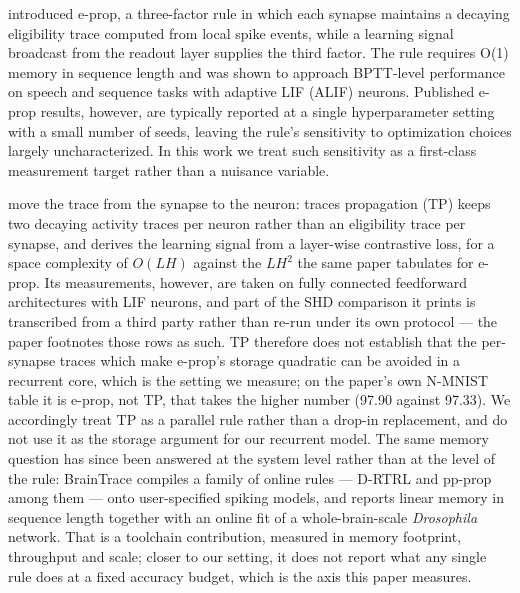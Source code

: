 \documentclass[11pt]{article}
\begin{document}
\citet{bellec2020eprop} introduced e-prop, a three-factor rule in which each
synapse maintains a decaying eligibility trace computed from local spike
events, while a learning signal broadcast from the readout layer supplies the
third factor. The rule requires O(1) memory in sequence length and was shown to
approach BPTT-level performance on speech and sequence tasks with adaptive
LIF (ALIF) neurons. Published e-prop results, however, are typically reported
at a single hyperparameter setting with a small number of seeds, leaving the
rule's sensitivity to optimization choices largely uncharacterized. In this
work we treat such sensitivity as a first-class measurement target rather
than a nuisance variable.

\citet{pes2025tp} move the trace from the synapse to the neuron: traces
propagation (TP) keeps two decaying activity traces per neuron rather than an
eligibility trace per synapse, and derives the learning signal from a layer-wise
contrastive loss, for a space complexity of $O(LH)$ against the $LH^{2}$ the
same paper tabulates for e-prop. Its measurements, however, are taken on fully
connected feedforward architectures with LIF neurons, and part of the SHD
comparison it prints is transcribed from a third party rather than re-run under
its own protocol --- the paper footnotes those rows as such. TP therefore does
not establish that the per-synapse traces which make e-prop's storage quadratic
can be avoided in a recurrent core, which is the setting we measure; on the
paper's own N-MNIST table it is e-prop, not TP, that takes the higher number
(97.90 against 97.33). We accordingly treat TP as a parallel rule rather than a
drop-in replacement, and do not use it as the storage argument for our
recurrent model. The same memory question has since been answered at the system
level rather than at the level of the rule: BrainTrace \citep{wang2026braintrace}
compiles a family of online rules --- D-RTRL and pp-prop among them --- onto
user-specified spiking models, and reports linear memory in sequence length
together with an online fit of a whole-brain-scale \textit{Drosophila} network.
That is a toolchain contribution, measured in memory footprint, throughput and
scale; closer to our setting, it does not report what any single rule does at a
fixed accuracy budget, which is the axis this paper measures.
\end{document}
